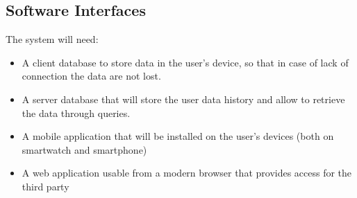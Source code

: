 \subsection{Software Interfaces}
The system will need:
\begin{itemize}
\item A client database to store data in the user’s device, so that in case of lack of connection the data are not lost.

\item A server database that will store the user data history and allow to retrieve the data through queries.
\item A mobile application that will be installed on the user’s devices (both on smartwatch and smartphone)
\item A web application usable from a modern browser that provides access for the third party
\end{itemize}


	
